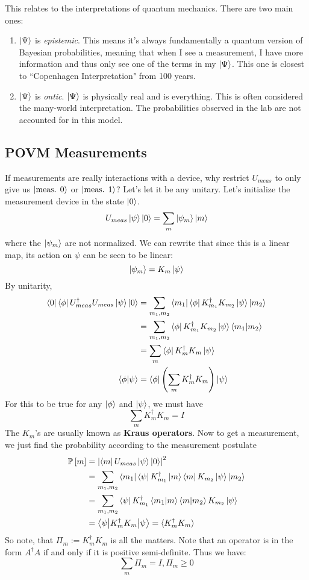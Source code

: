 This relates to the interpretations of quantum mechanics. There are two main ones:
\begin{enumerate}
    \item $\ket{\Psi}$ is \emph{epistemic}. This means it's always fundamentally a quantum version of Bayesian probabilities, meaning that when I see a measurement, I have more information and thus only see one of the terms in my $\ket{\Psi}$.
    This one is closest to ``Copenhagen Interpretation" from 100 years.
    \item $\ket{\Psi}$ is \emph{ontic}. $\ket{\Psi}$ is physically real and is everything. This is often considered the many-world interpretation. The probabilities observed in the lab are not accounted for in this model.
\end{enumerate}

\subsection{POVM Measurements}
If measurements are really interactions with a device, why restrict $U_{meas}$ to only give us $\ket{\text{meas. } 0}$ or $\ket{\text{meas. } 1}$?
Let's let it be any unitary. Let's initialize the measurement device in the state $\ket{0}$.
\[ U_{meas} \ket{\psi} \ket{0} = \sum_{m} \ket{\psi_m} \ket{m} \]
where the $\ket{\psi_m}$ are not normalized. We can rewrite that since this is a linear map, its action on $\psi$ can be seen to be linear:
\[ \ket{\psi_m} = K_m \ket{\psi} \]
By unitarity,
\begin{align*}
    \bra{0} \bra{\phi} U_{meas}^{\dagger} U_{meas} \ket{\psi} \ket{0} &= \sum_{m_1, m_2} \bra{m_1} \bra{\phi} K_{m_1}^{\dagger} K_{m_2} \ket{\psi} \ket{m_2} \\
    &= \sum_{m_1, m_2} \bra{\phi} K_{m_1}^{\dagger} K_{m_2} \ket{\psi} \braket{m_1}{m_2} \\
    &= \sum_m \bra{\phi} K_m^{\dagger} K_m \ket{\psi}  \\
    \braket{\phi}{\psi} &= \bra{\phi} \qty(\sum_m K_m^{\dagger} K_m) \ket{\psi}
\end{align*}
For this to be true for any $\ket{\phi}$ and $\ket{\psi}$, we must have
\[ \sum_m K_m^{\dagger} K_m = I \]
The $K_m$'s are usually known as \textbf{Kraus operators}. Now to get a measurement, we just find the probability
according to the measurement postulate
\begin{align*}
    \mathbb{P}\left[ m \right] &=  \qty|\bra{m} U_{meas} \ket{\psi} \ket{0}|^2 \\
    &= \sum_{m_1, m_2} \bra{m_1} \bra{\psi} K_{m_1}^{\dagger} \ket{m} \bra{m} K_{m_2} \ket{\psi} \ket{m_2}\\
    &= \sum_{m_1, m_2} \bra{\psi} K_{m_1}^{\dagger}  \braket{m_1}{m} \braket{m}{m_2} K_{m_2} \ket{\psi} \\
    &= \mel**{\psi}{K_m^{\dagger} K_m}{\psi} = \langle K_m^{\dagger} K_m \rangle
\end{align*}
So note, that $\Pi_m := K_m^{\dagger} K_m$ is all the matters. Note that an operator is in the form $A^{\dagger} A$ if and only if it is positive semi-definite.
Thus we have:
\[ \sum_m \Pi_m = I, \Pi_m \geq 0\]

